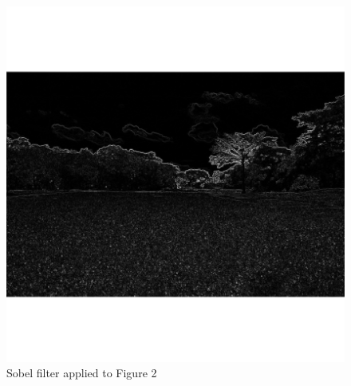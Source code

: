 \documentclass[12pt]{article}
\begin{document}
\begin{figure}[h]
\centering
\includegraphics[scale = 0.45]{img/landscape_Sobel}
\caption{Sobel filter applied to Figure 2}
\end{figure}
\newpage
\end{document}
